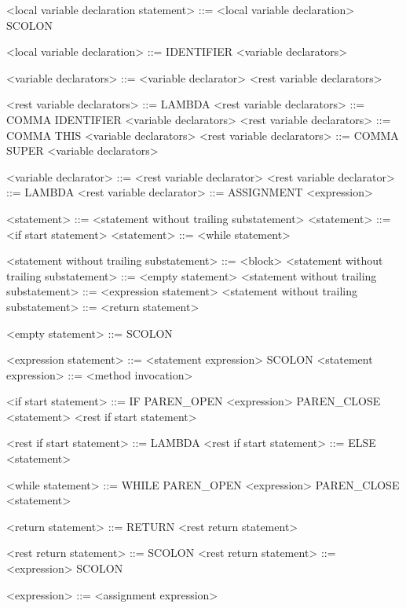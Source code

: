 <local variable declaration statement>    ::= <local variable declaration> SCOLON

<local variable declaration>              ::= IDENTIFIER <variable declarators>

<variable declarators>                    ::= <variable declarator> <rest variable declarators>

<rest variable declarators>               ::= LAMBDA
<rest variable declarators>               ::= COMMA IDENTIFIER <variable declarators>
<rest variable declarators>               ::= COMMA THIS <variable declarators>
<rest variable declarators>               ::= COMMA SUPER <variable declarators>

<variable declarator>                     ::= <rest variable declarator>
<rest variable declarator>                ::= LAMBDA
<rest variable declarator>                ::= ASSIGNMENT <expression>

<statement>                               ::= <statement without trailing substatement>
<statement>                               ::= <if start statement>
<statement>                               ::= <while statement>

<statement without trailing substatement> ::= <block>
<statement without trailing substatement> ::= <empty statement>
<statement without trailing substatement> ::= <expression statement>
<statement without trailing substatement> ::= <return statement>

<empty statement>                         ::= SCOLON

<expression statement>                    ::= <statement expression> SCOLON
<statement expression>                    ::= <method invocation>

<if start statement>                      ::= IF PAREN_OPEN <expression> PAREN_CLOSE <statement> <rest if start statement>

<rest if start statement>                 ::= LAMBDA
<rest if start statement>                 ::= ELSE <statement>

<while statement>                         ::= WHILE PAREN_OPEN <expression> PAREN_CLOSE <statement>

<return statement>                        ::= RETURN <rest return statement>

<rest return statement>                   ::= SCOLON
<rest return statement>                   ::= <expression> SCOLON

<expression>                              ::= <assignment expression>

